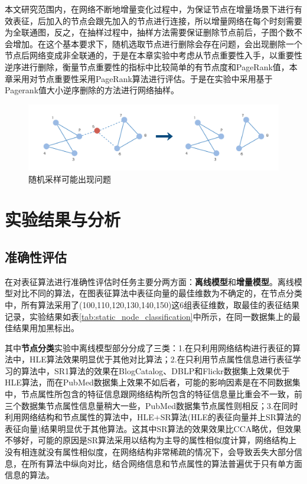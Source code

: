 本文研究范围内，在网络不断地增量变化过程中，为保证节点在增量场景下进行有效表征，后加入的节点会跟先加入的节点进行连接，所以增量网络在每个时刻需要为全联通图，反之，在抽样过程中，抽样方法需要保证删除节点前后，子图个数不会增加。在这个基本要求下，随机选取节点进行删除会存在问题，会出现删除一个节点后网络变成非全联通的，于是在本章实验中考虑从节点重要性入手，以重要性逆序进行删除，衡量节点重要性的指标中比较简单的有节点度和PageRank值\cite{page1999pagerank}，本章采用对节点重要性采用PageRank算法进行评估。于是在实验中采用基于Pagerank值大小逆序删除的方法进行网络抽样。
\begin{figure}
	\centering
	\includegraphics[width=6.2in]{figures/sample_split}
	\caption{随机采样可能出现问题}
\end{figure}


\section{实验结果与分析}
\subsection{准确性评估}
在对表征算法进行准确性评估时任务主要分两方面：\textbf{离线模型}和\textbf{增量模型}。离线模型对比不同的算法，在图表征算法中表征向量的最佳维数为不确定的，在节点分类中，所有算法采用了(100,110,120,130,140,150)这6组表征维数，取最佳的表征结果记录，实验结果如表\ref{tab:static_node_classification}中所示，在同一数据集上的最佳结果用加黑标出。

其中\textbf{节点分类}实验中离线模型部分分成了三类：1.在只利用网络结构进行表征的算法中，HLE算法效果明显优于其他对比算法；2.在只利用节点属性信息进行表征学习的算法中，SR1算法的效果在BlogCatalog、DBLP和Flickr数据集上效果优于HLE算法，而在PubMed数据集上效果不如后者，可能的影响因素是在不同数据集中，节点属性所包含的特征信息跟网络结构所包含的特征信息量比重会不一致，前三个数据集节点属性信息量稍大一些，PubMed数据集节点属性则相反；3.在同时利用网络结构和节点属性的算法中，HLE+SR算法(HLE的表征向量并上SR算法的表征向量)结果明显优于其他算法。这其中SR算法的效果效果比CCA略优，但效果不够好，可能的原因是SR算法采用以结构为主导的属性相似度计算，网络结构上没有相连就没有属性相似度，在网络结构非常稀疏的情况下，会导致丢失大部分信息，在所有算法中纵向对比，结合网络信息和节点属性的算法普遍优于只有单方面信息的算法。

